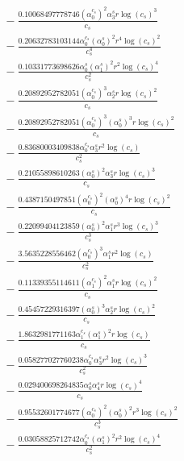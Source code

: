 \documentclass[10pt]{article}
\begin{document}
\begin{align*}
&{}  - \frac{0.10068497778746 \left(\alpha_{0}^{c_s}\right)^{2} \alpha_{3}^s r \log{\left(c_{s} \right)}^{3}}{c_{s}} \\
&{}  - \frac{0.20632783103144 \alpha_{0}^{c_s} \left(\alpha_{0}^s\right)^{2} r^{4} \log{\left(c_{s} \right)}^{2}}{c_{s}^{4}} \\
&{}  - \frac{0.10331773698626 \alpha_{0}^s \left(\alpha_{1}^s\right)^{2} r^{2} \log{\left(c_{s} \right)}^{4}}{c_{s}^{2}} \\
&{}  - \frac{0.20892952782051 \left(\alpha_{0}^{c_s}\right)^{3} \alpha_{2}^s r \log{\left(c_{s} \right)}^{2}}{c_{s}} \\
&{}  - \frac{0.20892952782051 \left(\alpha_{0}^{c_s}\right)^{3} \left(\alpha_{0}^s\right)^{3} r \log{\left(c_{s} \right)}^{2}}{c_{s}} \\
&{}  - \frac{0.83680003409838 \alpha_{0}^{c_s} \alpha_{3}^s r^{2} \log{\left(c_{s} \right)}}{c_{s}^{2}} \\
&{}  - \frac{0.21055898610263 \left(\alpha_{0}^s\right)^{2} \alpha_{3}^s r \log{\left(c_{s} \right)}^{3}}{c_{s}} \\
&{}  - \frac{0.4387150497851 \left(\alpha_{0}^{c_s}\right)^{2} \left(\alpha_{0}^s\right)^{4} r \log{\left(c_{s} \right)}^{2}}{c_{s}} \\
&{}  - \frac{0.22099404123859 \left(\alpha_{0}^s\right)^{2} \alpha_{1}^s r^{3} \log{\left(c_{s} \right)}^{3}}{c_{s}^{3}} \\
&{}  - \frac{3.5635228556462 \left(\alpha_{0}^{c_s}\right)^{3} \alpha_{1}^s r^{2} \log{\left(c_{s} \right)}}{c_{s}^{2}} \\
&{}  - \frac{0.11339355114611 \left(\alpha_{1}^{c_s}\right)^{2} \alpha_{1}^s r \log{\left(c_{s} \right)}^{2}}{c_{s}} \\
&{}  - \frac{0.45457229316397 \left(\alpha_{0}^s\right)^{3} \alpha_{2}^s r \log{\left(c_{s} \right)}^{2}}{c_{s}} \\
&{}  - \frac{1.8632981771163 \alpha_{1}^{c_s} \left(\alpha_{1}^s\right)^{2} r \log{\left(c_{s} \right)}}{c_{s}} \\
&{}  - \frac{0.058277027760238 \alpha_{0}^{c_s} \alpha_{3}^s r^{2} \log{\left(c_{s} \right)}^{3}}{c_{s}^{2}} \\
&{}  - \frac{0.029400698264835 \alpha_{0}^s \alpha_{4}^s r \log{\left(c_{s} \right)}^{4}}{c_{s}} \\
&{}  - \frac{0.95532601774677 \left(\alpha_{0}^{c_s}\right)^{2} \left(\alpha_{0}^s\right)^{2} r^{3} \log{\left(c_{s} \right)}^{2}}{c_{s}^{3}} \\
&{}  - \frac{0.03058825712742 \alpha_{0}^{c_s} \left(\alpha_{1}^s\right)^{2} r^{2} \log{\left(c_{s} \right)}^{4}}{c_{s}^{2}} \\

\end{align*}
\end{document}

